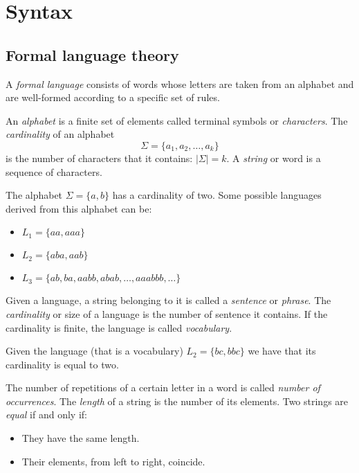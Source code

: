 \documentclass[12pt, a4paper]{report}
\newtheorem[style=M,bodystyle=\normalfont]{theorem}{Theorem}
\newtheorem[style=M,bodystyle=\normalfont]{corollary}{Corollary}
\newtheorem[style=M,bodystyle=\normalfont]{lemma}{Lemma}
\newtheorem[style=M,bodystyle=\normalfont]{definition}{Definition}
\begin{document}
\newpage

\tableofcontents

\newpage

\chapter{Syntax}
    \section{Formal language theory}
    A \emph{formal language} consists of words whose letters are taken from an alphabet and are well-formed according to a specific set of rules.
    \begin{definition}
        An \emph{alphabet} is a finite set of elements called terminal symbols or \emph{characters}. 
        The \emph{cardinality} of an alphabet \[\Sigma =\{ a_1,a_2,\dots, a_k \}\] is the number of characters that it contains: $\left\lvert \Sigma \right\rvert = k$. 
        A \emph{string} or word is a sequence of characters. 
    \end{definition}
    \begin{example}
        The alphabet $\Sigma =\{ a,b \}$ has a cardinality of two. Some possible languages derived from this alphabet can be:
        \begin{itemize}
            \item $L_1=\{aa,aaa\}$
            \item $L_2=\{aba,aab\}$
            \item $L_3=\{ab,ba,aabb,abab,\dots,aaabbb,\dots\}$
        \end{itemize}
    \end{example}
    \begin{definition}
        Given a language, a string belonging to it is called a \emph{sentence} or \emph{phrase}. The \emph{cardinality} or size of a language is the number of sentence it contains.
        If the cardinality is finite, the language is called \emph{vocabulary}. 
    \end{definition}
    \begin{example}
        Given the language (that is a vocabulary) $L_2=\{ bc,bbc \}$ we have that its cardinality is equal to two. 
    \end{example}
    \begin{definition}
        The number of repetitions of a certain letter in a word is called \emph{number of occurrences}. The \emph{length} of a string is the number of its elements. 
        Two strings are \emph{equal} if and only if: 
        \begin{itemize}
            \item They have the same length.
            \item Their elements, from left to right, coincide. 
        \end{itemize}
    \end{definition}
\end{document}
